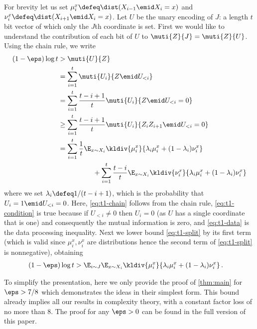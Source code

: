 For brevity let us set $\mu_i^x \defeq \dist(X_{i-1}\emid X_i = x)$ and 
$\nu_i^x \defeq \dist(X_{i+1}\emid X_i=x)$.
Let $U$ be the unary encoding of $J$: a length $t$ bit
vector of which only the $J$th coordinate is set.
First we would like to understand 
the contribution of each bit of $U$ to 
$\muti{Z}{J}=\muti{Z}{U}$.
Using the chain rule, we write
\begin{align}
(1-\eps)\log t&>   \muti{U}{Z} \nonumber\\
              &=   \sum_{i=1}^t \muti{U_i}{Z\emid U_{<i}}
                    \label{eq:t1-chain}\\
              &=   \sum_{i=1}^t \frac{t-i+1}{t}
                   \muti{U_i}{Z\emid U_{<i}=0}
                   \label{eq:t1-condition}\\
           &\ge \sum_{i=1}^t \frac{t-i+1}{t}
                \muti{U_i}{Z_iZ_{i+1}\emid U_{<i}=0}
                \label{eq:t1-data}\\
           &=   \sum_{i=1}^t\frac{1}{t}
                \E_{x\sim X_i}\kldiv{\mu_i^x}
                {\lambda_i \mu_i^x + (1-\lambda_i)\nu^x_i}
                \nonumber\\
           &\quad\quad\quad\quad\quad
                + \sum_{i=1}^t\frac{t-i}{t}
                \E_{x\sim X_i}\kldiv{\nu_i^x} 
                {\lambda_i\mu_i^x + (1-\lambda_i)\nu^x_i}
                \label{eq:t1-split}
\end{align}
where we set $\lambda_i \defeq 1/(t-i+1)$, which is
the probability that $U_i=1\emid U_{<i}=0$.
Here, \autoref{eq:t1-chain} follows from the 
chain rule, \autoref{eq:t1-condition} is 
true because if $U_{<i}\neq 0$ then $U_i=0$ 
(as $U$ has a single coordinate that is one) 
and consequently the mutual information is
zero, and \autoref{eq:t1-data} is the data 
processing inequality. Next we lower bound 
\autoref{eq:t1-split} by its first term 
(which is valid since $\mu^x_i, \nu^x_i$ 
are distributions hence the second term of 
\autoref{eq:t1-split} is nonnegative), obtaining
\begin{align}
       (1-\eps) \log t &> \E_{i\sim J}\E_{x\sim X_i}
                \kldiv{\mu_i^x}
                      {\lambda_i \mu_i^x 
                      + (1-\lambda_i)\nu^x_i}\,.
                \label{eq:mut-inf}
\end{align}

To simplify the presentation, here we only 
provide the proof of \autoref{thm:main} for 
$\eps >7/8$ which demonstrates the ideas in 
their simplest form. This bound already implies all 
our results in complexity theory, with a constant
factor loss of no more than 8.
The proof for any $\eps>0$ can be found in the 
full version of this paper.

